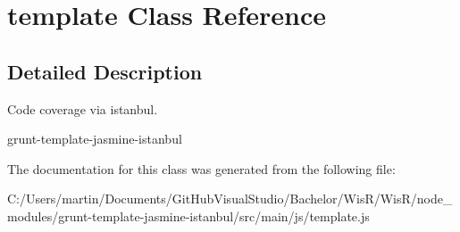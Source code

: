 \hypertarget{classtemplate}{}\section{template Class Reference}
\label{classtemplate}


\subsection{Detailed Description}
Code coverage via istanbul.

grunt-\/template-\/jasmine-\/istanbul 

The documentation for this class was generated from the following file\+:\begin{DoxyCompactItemize}
\item 
C\+:/\+Users/martin/\+Documents/\+Git\+Hub\+Visual\+Studio/\+Bachelor/\+Wis\+R/\+Wis\+R/node\+\_\+modules/grunt-\/template-\/jasmine-\/istanbul/src/main/js/template.\+js\end{DoxyCompactItemize}
